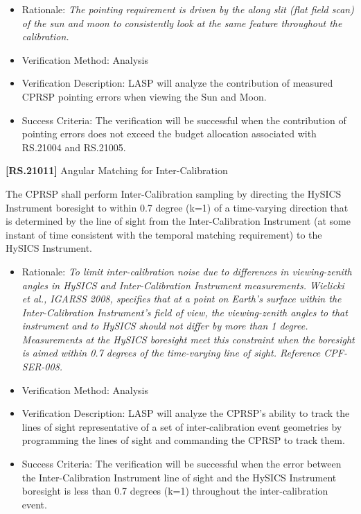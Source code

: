 \begin{itemize}
\item{} Rationale: \emph{The pointing requirement is driven by the along slit (flat field scan) of the sun and moon to consistently look at the same feature throughout the calibration.}

\item{} Verification Method: Analysis

\item{} Verification Description: \gls{LASP} will analyze the contribution of \gls{measure}d \gls{CPRSP} \gls{point}ing errors when viewing the Sun and Moon.

\item{} Success Criteria: The verification will be successful when the contribution of \gls{point}ing errors does not exceed the budget allocation associated with \gls{RS}.21004 and \gls{RS}.21005.

\end{itemize}

\textbf{[RS.21011]} Angular Matching for Inter-Calibration

The \gls{CPRSP} shall perform Inter-Calibration sampling by directing the \gls{HySICS} Instrument boresight to within 0.7 degree (k=1) of a time-varying direction that is determined by the line of sight from the Inter-Calibration Instrument (at some instant of time consistent with the temporal matching requirement) to the \gls{HySICS} Instrument.

\begin{itemize}
\item{} Rationale: \emph{To limit inter-calibration noise due to differences in viewing-zenith angles in HySICS and Inter-Calibration Instrument measurements. Wielicki et al., IGARSS 2008, specifies that at a point on Earth's surface within the Inter-Calibration Instrument's field of view, the viewing-zenith angles to that instrument and to HySICS should not differ by more than 1 degree. Measurements at the HySICS boresight meet this constraint when the boresight is aimed within 0.7 degrees of the time-varying line of sight. Reference CPF-SER-008.}

\item{} Verification Method: Analysis

\item{} Verification Description: \gls{LASP} will analyze the \gls{CPRSP}'s ability to track the lines of sight representative of a set of inter-calibration event geometries by programming the lines of sight and commanding the \gls{CPRSP} to track them.

\item{} Success Criteria: The verification will be successful when the error between the Inter-Calibration Instrument line of sight and the \gls{HySICS} Instrument boresight is less than 0.7 degrees (k=1) throughout the inter-calibration event.

\end{itemize}

